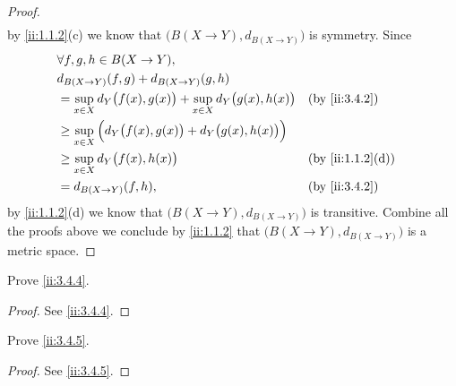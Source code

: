 \begin{proof}
\begin{align*}
  \end{align*}
  by \cref{ii:1.1.2}(c) we know that \(\big(B(X \to Y), d_{B(X \to Y)}\big)\) is symmetry.
  Since
  \begin{align*}
     & \forall f, g, h \in B(X \to Y),                                                                         \\
     & d_{B(X \to Y)}(f, g) + d_{B(X \to Y)}(g, h)                                                             \\
     & = \sup_{x \in X} d_Y\big(f(x), g(x)\big) + \sup_{x \in X} d_Y\big(g(x), h(x)\big) &  & \by{ii:3.4.2}    \\
     & \geq \sup_{x \in X} \Big(d_Y\big(f(x), g(x)\big) + d_Y\big(g(x), h(x)\big)\Big)                         \\
     & \geq \sup_{x \in X} d_Y\big(f(x), h(x)\big)                                       &  & \by{ii:1.1.2}[d] \\
     & = d_{B(X \to Y)}(f, h),                                                           &  & \by{ii:3.4.2}
  \end{align*}
  by \cref{ii:1.1.2}(d) we know that \(\big(B(X \to Y), d_{B(X \to Y)}\big)\) is transitive.
  Combine all the proofs above we conclude by \cref{ii:1.1.2} that \(\big(B(X \to Y), d_{B(X \to Y)}\big)\) is a metric space.
\end{proof}

\begin{ex}\label{ii:ex:3.4.2}
  Prove \cref{ii:3.4.4}.
\end{ex}

\begin{proof}
  See \cref{ii:3.4.4}.
\end{proof}

\begin{ex}\label{ii:ex:3.4.3}
  Prove \cref{ii:3.4.5}.
\end{ex}

\begin{proof}
  See \cref{ii:3.4.5}.
\end{proof}

